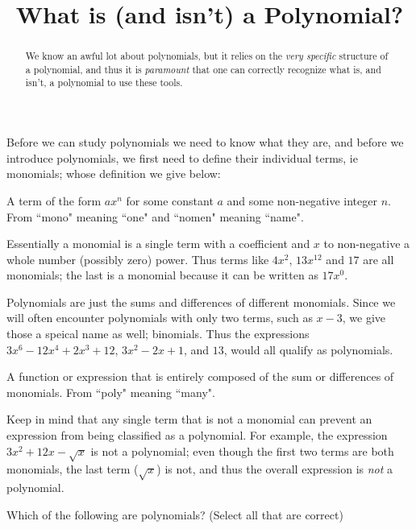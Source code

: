 \documentclass{ximera}
\title{What is (and isn't) a Polynomial?}
\begin{document}
\begin{abstract}
    We know an awful lot about polynomials, but it relies on the \textit{very specific} structure of a polynomial, and thus it is \textit{paramount} that one can correctly recognize what is, and isn't, a polynomial to use these tools.
\end{abstract}
\maketitle



Before we can study polynomials we need to know what they are, and before we introduce polynomials, we first need to define their individual terms, ie monomials; whose definition we give below:

\begin{definition}[Monomial]
    A term of the form $ax^n$ for some constant $a$ and some non-negative integer $n$. From ``mono" meaning ``one" and ``nomen" meaning ``name".
\end{definition} 

Essentially a monomial is a single term with a coefficient and $x$ to non-negative a whole number (possibly zero) power. Thus terms like $4x^2$, $13x^{12}$ and $17$ are all monomials; the last is a monomial because it can be written as $17x^0$.

Polynomials are just the sums and differences of different monomials. Since we will often encounter polynomials with only two terms, such as $x - 3$, we give those a speical name as well; binomials. Thus the expressions $3x^6 - 12x^4 + 2x^3 + 12$, $3x^2 - 2x + 1$, and $13$, would all qualify as polynomials.

 \begin{definition}[Polynomial]
    A function or expression that is entirely composed of the sum or differences of monomials. From ``poly" meaning ``many".
\end{definition} 

Keep in mind that any single term that is not a monomial can prevent an expression from being classified as a polynomial. For example, the expression $3x^2 + 12x - \sqrt{x}$ is not a polynomial; even though the first two terms are both monomials, the last term ($\sqrt{x}$) is not, and thus the overall expression is \textit{not} a polynomial.


\begin{question}
    Which of the following are polynomials? (Select all that are correct)
    \begin{multipleChoice}
    \end{multipleChoice}
\end{question}
\end{document}
